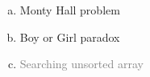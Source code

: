 \begin{frame}{}

  {\large
    \begin{enumerate}[(a)]
      \centering
      \setlength{\itemsep}{6pt}
      \item Monty Hall problem
      \item Boy or Girl paradox
      \item \textcolor{gray}{Searching unsorted array}
    \end{enumerate}
  }
\end{frame}

% 
